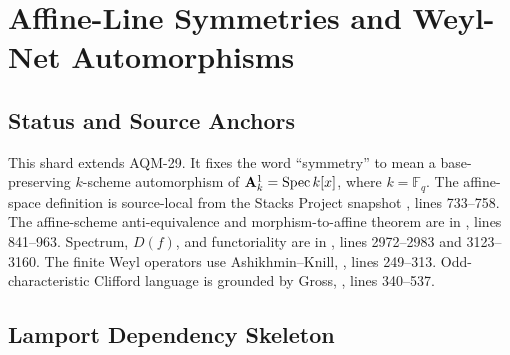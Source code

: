 
\section{Affine-Line Symmetries and Weyl-Net Automorphisms}
\label{sec:affine-line-symmetry-weyl-net}

\subsection{Status and Source Anchors}

This shard extends AQM-29.  It fixes the word ``symmetry'' to mean a
base-preserving \(k\)-scheme automorphism of
\(\mathbf A^1_k=\operatorname{Spec} k[x]\), where \(k=\mathbb F_q\).  The affine-space
definition is source-local from the Stacks Project snapshot
, lines
733--758.  The affine-scheme anti-equivalence and morphism-to-affine theorem
are in ,
lines 841--963.  Spectrum, \(D(f)\), and functoriality are in
, lines
2972--2983 and 3123--3160.  The finite Weyl operators use
Ashikhmin--Knill,
,
lines 249--313.  Odd-characteristic Clifford language is grounded by Gross,
, lines
340--537.

\subsection{Lamport Dependency Skeleton}

